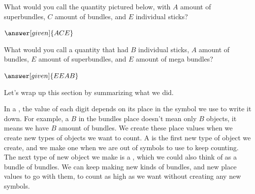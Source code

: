 \documentclass{ximera}
\begin{document}

\begin{question}
What would you call the quantity pictured below, with $A$ amount of superbundles, $C$ amount of bundles, and $E$ individual sticks?

\begin{image}
\end{image}

\begin{prompt}
$\answer[given]{ACE}$
\end{prompt}
\end{question}

\begin{question}
What would you call a quantity that had $B$ individual sticks, $A$ amount of bundles, $E$ amount of superbundles, and $E$ amount of mega bundles?

\begin{prompt}
$\answer[given]{EEAB}$
\end{prompt}
\end{question}

Let's wrap up this section by summarizing what we did.

\begin{definition}
In a , the value of each digit depends on its place in the symbol we use to write it down. For example, a $B$ in the bundles place doesn't mean only $B$ objects, it means we have $B$ amount of bundles. We create these place values when we create new types of objects we want to count. A  is the first new type of object we create, and we make one when we are out of symbols to use to keep counting. The next type of new object we make is a , which we could also think of as a bundle of bundles. We can keep making new kinds of bundles, and new place values to go with them, to count as high as we want without creating any new symbols.
\end{definition}
\end{document}
